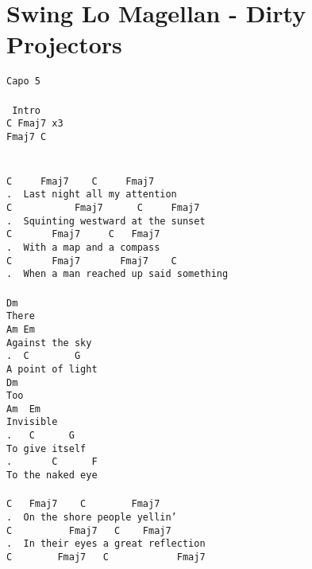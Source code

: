 \newpage
\section{Swing Lo Magellan - Dirty Projectors}
\label{Swing Lo Magellan - Dirty Projectors}
\texttt{Capo\ 5\\
\\
\lbrack\ Intro\rbrack\\
C\ Fmaj7\ x3\ \\
Fmaj7\ C\\
\\
\\
C\ \ \ \ \ Fmaj7\ \ \ \ C\ \ \ \ \ Fmaj7\\
. \ Last\ night\ all\ my\ attention\\
C\ \ \ \ \ \ \ \ \ \ \ Fmaj7\ \ \ \ \ \ C\ \ \ \ \ Fmaj7\\
. \ Squinting\ westward\ at\ the\ sunset\\
C\ \ \ \ \ \ \ Fmaj7\ \ \ \ \ C\ \ \ Fmaj7\\
. \ With\ a\ map\ and\ a\ compass\\
C\ \ \ \ \ \ \ Fmaj7\ \ \ \ \ \ \ Fmaj7\ \ \ \ C\\
. \ When\ a\ man\ reached\ up\ said\ something\\
\\
Dm\\
There\\
Am\ Em\\
Against\ the\ sky\\
. \ C\ \ \ \ \ \ \ \ G\\
A\ point\ of\ light\\
Dm\\
Too\\
Am\ \ Em\\
Invisible\\
. \ \ C\ \ \ \ \ \ G\\
To\ give\ itself\\
. \ \ \ \ \ \ C\ \ \ \ \ \ F\\
To\ the\ naked\ eye\\
\\
C\ \ \ Fmaj7\ \ \ \ C\ \ \ \ \ \ \ \ Fmaj7\\
. \ On\ the\ shore\ people\ yellin'\\
C\ \ \ \ \ \ \ \ \ \ Fmaj7\ \ \ C\ \ \ \ Fmaj7\\
. \ In\ their\ eyes\ a\ great\ reflection\\
C\ \ \ \ \ \ \ \ Fmaj7\ \ \ C\ \ \ \ \ \ \ \ \ \ \ \ Fmaj7\\
}
